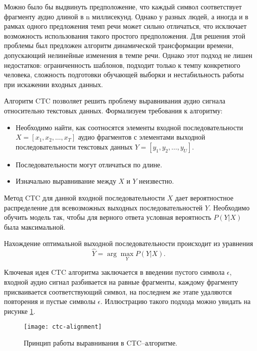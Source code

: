 Можно было бы выдвинуть предположение, что каждый символ соответствует фрагменту аудио длиной в n миллисекунд. Однако у разных людей, а иногда и в рамках одного предложения темп речи может сильно отличаться, что исключает возможность использования такого простого предположения. Для решения этой проблемы был предложен алгоритм динамической трансформации времени\cite{berndt1994using}, допускающий нелинейные изменения в темпе речи. Однако этот подход не лишен недостатков: ограниченность шаблонов, подходит только к темпу конкретного человека, сложность подготовки обучающей выборки и нестабильность работы при искажении входных данных.

Алгоритм CTC позволяет решить проблему выравнивания аудио сигнала относительно текстовых данных. Формализуем требования к алгоритму:
\begin{itemize}
	\item Необходимо найти, как соотносятся элементы входной последовательности $X = [x_1, x_2, \dots, x_T]$ аудио фрагментов с элементами выходной последовательности текстовых данных $Y = [y_1, y_2, \dots, y_U]$.
	\item Последовательности могут отличаться по длине.
	\item Изначально выравнивание между $X$ и $Y$ неизвестно.
\end{itemize}

Метод CTC для данной входной последовательности $X$ дает вероятностное распределение для всевозможных выходных последовательностей $Y$. Необходимо обучить модель так, чтобы для верного ответа условная вероятность $P(Y | X)$ была максимальной.

Нахождение оптимальной выходной последовательности происходит из уравнения
\begin{equation}
	\label{eq:ctc-result}
	\hat{Y} = \arg \max_Y P(Y | X).
\end{equation}

Ключевая идея CTC алгоритма заключается в введении пустого символа $\epsilon$, входной аудио сигнал разбивается на равные фрагменты, каждому фрагменту присваивается соответствующий символ, на последнем же этапе удаляются повторения и пустые символы $\epsilon$. Иллюстрацию такого подхода можно увидать на рисунке \ref{fig:ctc-alignment}.

\begin{figure}[h]
	\centering
	\texttt{[image: ctc-alignment]}
	\caption{Принцип работы выравнивания в CTC--алгоритме.}
	\label{fig:ctc-alignment}
\end{figure}


